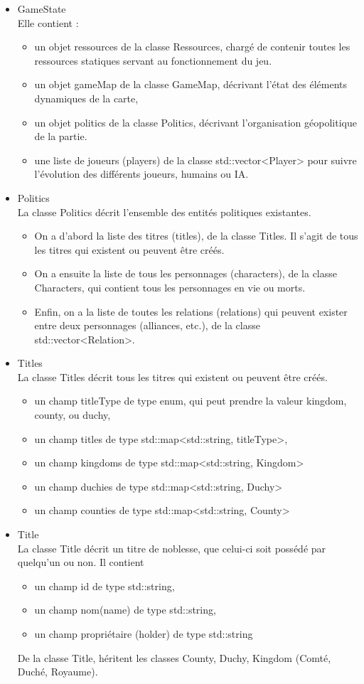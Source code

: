\documentclass[a4paper,12pt]{article}
\begin{document}
\begin{itemize}
\item GameState\\
Elle contient :
\begin{itemize}
\item un objet ressources de la classe Ressources, chargé de contenir toutes les ressources statiques servant au fonctionnement du jeu. 
\item un objet gameMap de la classe GameMap, décrivant l'état des éléments dynamiques de la carte, 
\item un objet politics de la classe Politics, décrivant l'organisation géopolitique de la partie. 
\item une liste de joueurs (players) de la classe std::vector<Player> pour suivre l'évolution des différents joueurs, humains ou IA.
\end{itemize}

\item Politics\\
La classe Politics décrit l'ensemble des entités politiques existantes. 
\begin{itemize}
\item On a d'abord la liste des titres (titles), de la classe Titles. Il s'agit de tous les titres qui existent ou peuvent être créés. 
\item On a ensuite la liste de tous les personnages (characters), de la classe Characters, qui contient tous les personnages en vie ou morts. 
\item Enfin, on a la liste de toutes les relations (relations) qui peuvent exister entre deux personnages (alliances, etc.), de la classe std::vector<Relation>. 
\end{itemize}

\item Titles\\
La classe Titles décrit tous les titres qui existent ou peuvent être créés.
\begin{itemize}
\item un champ titleType de type enum, qui peut prendre la valeur kingdom, county, ou duchy,
\item un champ titles de type std::map<std::string, titleType>,
\item un champ kingdoms de type std::map<std::string, Kingdom>
\item un champ duchies de type std::map<std::string, Duchy>
\item un champ counties de type std::map<std::string, County>
\end{itemize}
\item Title\\
La classe Title décrit un titre de noblesse, que celui-ci soit possédé par quelqu'un ou non. Il contient
\begin{itemize}
\item un champ id de type std::string,
\item un champ nom(name) de type std::string,
\item un champ propriétaire (holder) de type std::string
\end{itemize}
De la classe Title, héritent les classes County, Duchy, Kingdom (Comté, Duché, Royaume). 


\end{itemize}
\end{document}

